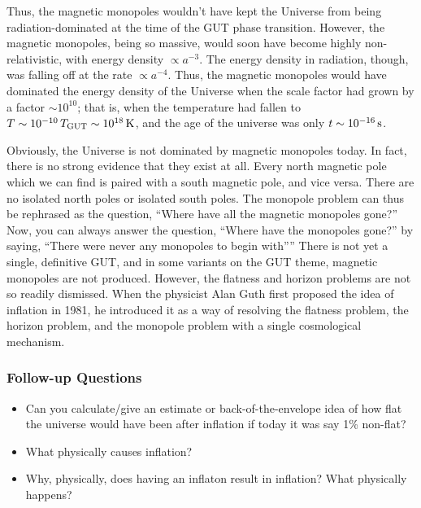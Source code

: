 \documentclass[a4paper,11pt]{article}
\begin{document}
{\noindent}Thus, the magnetic monopoles wouldn't have kept the Universe from being radiation-dominated at the time of the GUT phase transition. However, the magnetic monopoles, being so massive, would soon have become highly non-relativistic, with energy density $\propto a^{-3}$. The energy density in radiation, though, was falling off at the rate $\propto a^{-4}$. Thus, the magnetic monopoles would have dominated the energy density of the Universe when the scale factor had grown by a factor $\sim10^{10}$; that is, when the temperature had fallen to $T\sim10^{-10}\,T_\mathrm{GUT}\sim10^{18}\,{\rm K}$, and the age of the universe was only $t\sim10^{-16}\,{\rm s}$.

{\noindent}Obviously, the Universe is not dominated by magnetic monopoles today. In fact, there is no strong evidence that they exist at all. Every north magnetic pole which we can find is paired with a south magnetic pole, and vice versa. There are no isolated north poles or isolated south poles. The monopole problem can thus be rephrased as the question, ``Where have all the magnetic monopoles gone?'' Now, you can always answer the question, ``Where have the monopoles gone?'' by saying, ``There were never any monopoles to begin with''” There is not yet a single, definitive GUT, and in some variants on the GUT theme, magnetic monopoles are not produced. However, the flatness and horizon problems are not so readily dismissed. When the physicist Alan Guth first proposed the idea of inflation in 1981, he introduced it as a way of resolving the flatness problem, the horizon problem, and the monopole problem with a single cosmological mechanism.

\subsubsection{Follow-up Questions}

\begin{itemize}
    \item Can you calculate/give an estimate or back-of-the-envelope idea of how flat the universe would have been after inflation if today it was say 1\% non-flat?
    \item What physically causes inflation?
    \item Why, physically, does having an inflaton result in inflation? What physically happens?

\end{itemize}

%
%
\end{document}
